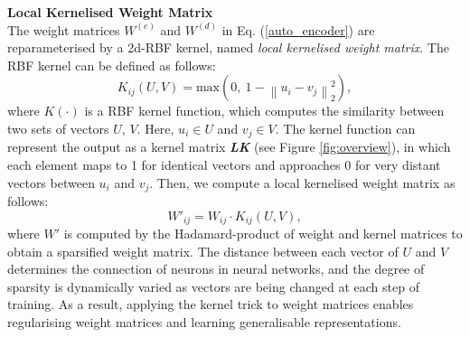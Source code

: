 \documentclass[sigconf]{acmart}
\begin{document}
\medskip

\noindent\textbf{Local Kernelised Weight Matrix}\\
The weight matrices $W^{(e)}$ and $W^{(d)}$ in Eq. (\ref{auto_encoder}) are reparameterised by a 2d-RBF kernel, named \textit{local kernelised weight matrix}. The RBF kernel can be defined as follows:
\setlength{\belowdisplayskip}{4pt}
\setlength{\abovedisplayskip}{4pt}
\begin{equation}
\label{local_kernel}
K_{ij}(U, V) = \text{max}(0, \ 1 - \left \| u_{i}- v_{j} \right \|_{2}^{2}),
\end{equation}
where $K(\cdot)$ is a RBF kernel function, which computes the similarity between two sets of vectors $U$, $V$. Here, $u_i \in U$ and $v_j \in V$. The kernel function can represent the output as a kernel matrix \textbf{\textit{LK}} (see Figure \ref{fig:overview}), in which each element maps to 1 for identical vectors and approaches 0 for very distant vectors between $u_i$ and $v_j$. Then, we compute a local kernelised weight matrix as follows:
\setlength{\belowdisplayskip}{4pt}
\setlength{\abovedisplayskip}{4pt}
\begin{equation}
\label{local_kernelised_weight_matrix}
{W}'_{ij} = W_{ij} \cdot K_{ij}(U, V),
\end{equation}
where ${W}'$ is computed by the Hadamard-product of weight and kernel matrices to obtain a sparsified weight matrix. The distance between each vector of $U$ and $V$ determines the connection of neurons in neural networks, and the degree of sparsity is dynamically varied as vectors are being changed at each step of training. As a result, applying the kernel trick to weight matrices enables regularising weight matrices and learning generalisable representations.
\end{document}
